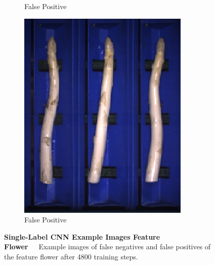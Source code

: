 \begin{figure}[h]
\begin{subfigure}{0.3\textwidth}
		\vspace{-5pt}
		\caption{False Positive}
	\end{subfigure}
	\begin{subfigure}{0.3\textwidth}
		\includegraphics[width=0.9\linewidth]{Figures/appendix/flower_falsepositive_03.png}
		\vspace{-5pt}
		\caption{False Positive}
	\end{subfigure}
	\vspace{-5pt}
	\caption[Single-Label CNN Example Images Feature Flower]{\textbf{Single-Label CNN Example Images Feature Flower}~~~Example images of false negatives and false positives of the feature flower after 4800 training steps.}
		\vspace{-20pt}
    \label{fig:ExampleImagesFlower}
\end{figure}

